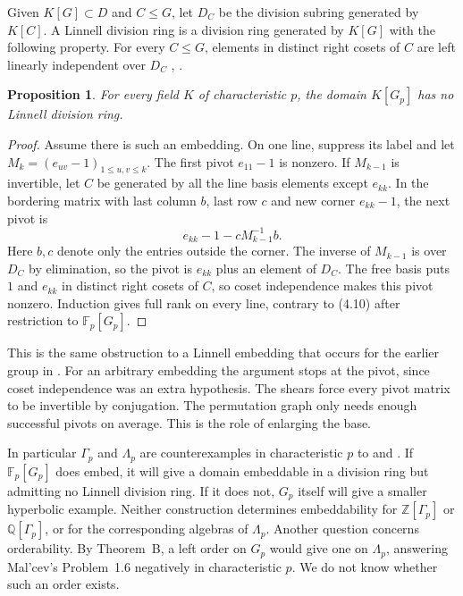 \documentclass[11pt,a4paper]{article}
\newtheorem{proposition}[theorem]{Proposition}
\numberwithin{equation}{section}
\begin{document}
Given $K[G]\subset D$ and $C\leq G$, let $D_C$ be the division subring
generated by $K[C]$. A Linnell division ring is a division ring generated
by $K[G]$ with the following property. For every $C\leq G$, elements in
distinct right cosets of $C$ are left linearly independent over $D_C$
\cite[Section~2.3]{r14}, \cite[Definition~2.2]{r11}.

\begin{proposition}
For every field $K$ of characteristic $p$, the domain $K[G_p]$ has no
Linnell division ring.
\end{proposition}

\begin{proof}
Assume there is such an embedding. On one line, suppress its label and let
$M_k=(e_{uv}-1)_{1\leq u,v\leq k}$. The first pivot $e_{11}-1$ is nonzero.
If $M_{k-1}$ is invertible, let $C$ be generated by all the line basis
elements except $e_{kk}$. In the bordering matrix with last column $b$,
last row $c$ and new corner $e_{kk}-1$, the next pivot is
\[
 e_{kk}-1-cM_{k-1}^{-1}b .
\]
Here $b,c$ denote only the entries outside the corner. The inverse of
$M_{k-1}$ is over $D_C$ by elimination, so the pivot is $e_{kk}$ plus an
element of $D_C$. The free basis puts $1$ and $e_{kk}$ in distinct right
cosets of $C$, so coset independence makes this pivot nonzero. Induction
gives full rank on every line, contrary to (4.10) after restriction to
$\mathbb F_p[G_p]$.
\end{proof}

This is the same obstruction to a Linnell embedding that occurs for the
earlier group in \cite[Theorem~1.4 and Corollary~6.5]{r9}. For an arbitrary
embedding the argument stops at the pivot, since coset independence was an
extra hypothesis. The shears force every pivot matrix to be invertible by
conjugation. The permutation graph only needs enough successful pivots on
average. This is the role of enlarging the base.

In particular $\Gamma_p$ and $\Lambda_p$ are counterexamples in characteristic
$p$ to \cite[Conjecture~1]{r14} and \cite[Conjecture~1.1]{r11}.
If $\mathbb F_p[G_p]$ does embed, it will give a domain embeddable in a
division ring but admitting no Linnell division ring. If it does not, $G_p$
itself will give a smaller hyperbolic example. Neither construction
determines embeddability for $\mathbb Z[\Gamma_p]$ or $\mathbb Q[\Gamma_p]$,
or for the corresponding algebras of $\Lambda_p$. Another question concerns
orderability. By Theorem~B, a left order on $G_p$ would give one on
$\Lambda_p$, answering Mal'cev's Problem~1.6 negatively in characteristic
$p$. We do not know whether such an order exists.
\end{document}
